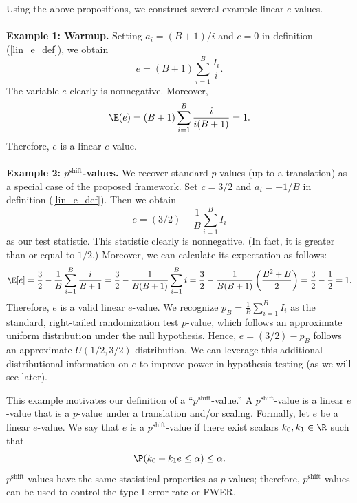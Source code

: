 \documentclass[12pt]{article}
\begin{document}
Using the above propositions, we construct several example linear $e$-values.
\\ \\ \noindent
\textbf{Example 1: Warmup.} Setting $a_i = (B+1)/i$ and $c = 0$ in definition (\ref{lin_e_def}), we obtain
$$e = (B+1)\sum_{i=1}^B \frac{I_i}{i}.$$ The variable $e$ clearly is nonnegative. Moreover, $$ \E(e) = (B+1) \sum_{i=1}^B \frac{ i }{i(B+1)} = 1.$$ Therefore, $e$ is a linear $e$-value.
\\ \\ \noindent
\textbf{Example 2: $p^\textrm{shift}$-values.} We recover standard $p$-values (up to a translation) as a special case of the proposed framework. Set $c = 3/2$ and $a_i = -1/B$ in definition (\ref{lin_e_def}). Then we obtain
$$e = (3/2) - \frac{1}{B} \sum_{i=1}^B I_i$$
as our test statistic. This statistic clearly is nonnegative. (In fact, it is greater than or equal to $1/2$.) Moreover, we can calculate its expectation as follows:
$$
\E[e] = \frac{3}{2} - \frac{1}{B} \sum_{i=1}^B \frac{i}{B+1} = \frac{3}{2}  - \frac{1}{B(B+1)} \sum_{i=1}^B i =  \frac{3}{2} - \frac{1}{B(B+1)} \left(\frac{B^2 + B}{2} \right) = \frac{3}{2} - \frac{1}{2} = 1.
$$
Therefore, $e$ is a valid linear $e$-value. We recognize $p_B = \frac{1}{B} \sum_{i=1}^B I_i$ as the standard, right-tailed randomization test $p$-value, which follows an approximate uniform distribution under the null hypothesis. Hence, $e = (3/2) - p_B$ follows an approximate $U(1/2,3/2)$ distribution. We can leverage this additional distributional information on $e$ to improve power in hypothesis testing (as we will see later). 

This example motivates our definition of a ``$p^\textrm{shift}$-value.'' A $p^\textrm{shift}$-value is a linear $e$-value that is a $p$-value under a translation and/or scaling. Formally, let $e$ be a linear $e$-value. We say that $e$ is a $p^\textrm{shift}$-value if there exist scalars $k_0, k_1 \in \R$ such that
$$\P( k_0 + k_1 e \leq \alpha ) \leq \alpha.$$ $p^\textrm{shift}$-values have the same statistical properties as $p$-values; therefore, $p^\textrm{shift}$-values can be used to control the type-I error rate or FWER.
\end{document}

